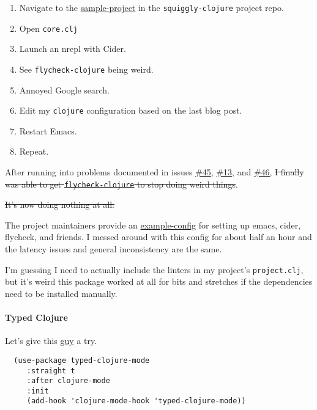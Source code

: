 \documentclass[11pt]{article}
\begin{document}
\begin{enumerate}
\item Navigate to the \href{https://github.com/clojure-emacs/squiggly-clojure/tree/master/sample-project}{sample-project} in the \texttt{squiggly-clojure} project repo.
\item Open \texttt{core.clj}
\item Launch an nrepl with Cider.
\item See \texttt{flycheck-clojure} being weird.
\item Annoyed Google search.
\item Edit my \texttt{clojure} configuration based on the last blog post.
\item Restart Emacs.
\item Repeat.
\end{enumerate}

After running into problems documented in issues \href{https://github.com/clojure-emacs/squiggly-clojure/issues/45}{\#45}, \href{https://github.com/clojure-emacs/squiggly-clojure/issues/13}{\#13}, and \href{https://github.com/clojure-emacs/squiggly-clojure/issues/46}{\#46,}
\sout{I finally was able to get \texttt{flycheck-clojure} to stop doing weird things}.

\sout{It's now doing nothing at all.}

The project maintainers provide an \href{https://github.com/clojure-emacs/example-config}{example-config} for setting up
emacs, cider, flycheck, and friends. I messed around with this config
for about half an hour and the latency issues and general
inconsistency are the same.

I'm guessing I need to actually include the linters in my project's
\texttt{project.clj}, but it's weird this package worked at all for bits and
stretches if the dependencies need to be installed manually.

\paragraph*{Typed Clojure}
\label{sec:orgd0632e5}

Let's give this \href{https://github.com/typedclojure/typed-clojure-mode}{guy} a try.

\begin{verbatim}
  (use-package typed-clojure-mode
     :straight t
     :after clojure-mode
     :init
     (add-hook 'clojure-mode-hook 'typed-clojure-mode))
\end{verbatim}
\end{document}
